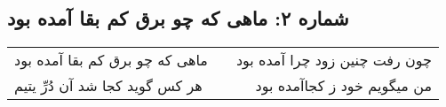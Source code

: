 \begin{center}
\section*{شماره ۲: ماهی که چو برق کم بقا آمده بود}
\label{sec:002}
\begin{longtable}{l p{0.5cm} r}
ماهی که چو برق کم بقا آمده بود
&&
چون رفت چنین زود چرا آمده بود
\\
هر کس گوید کجا شد آن دُرِّ یتیم
&&
من میگویم خود ز کجاآمده بود
\\
\end{longtable}
\end{center}
